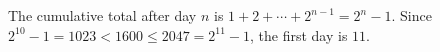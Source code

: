 The cumulative total after day $n$ is $1+2+\cdots+2^{n-1}=2^n-1$. Since $2^{10}-1=1023<1600\le2047=2^{11}-1$, the first day is $\boxed{11}$.
